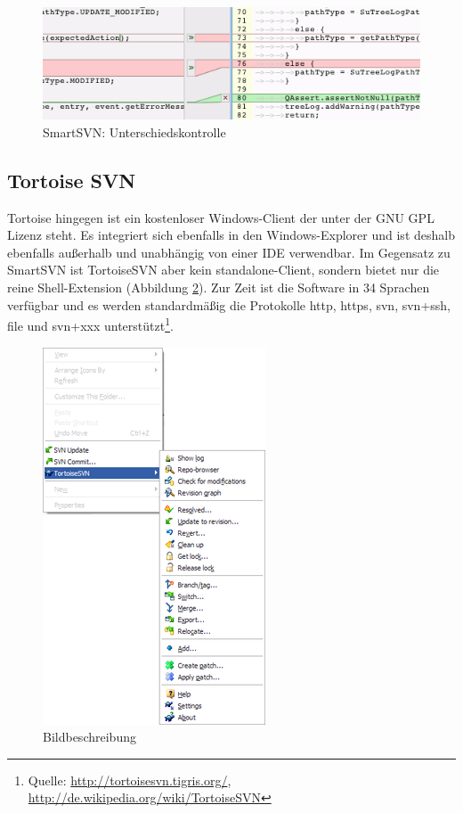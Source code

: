\begin{figure}[!htb]
        \centering
        \includegraphics[width=.9\textwidth]{3_smartsvn3.png}
        \caption{SmartSVN: Unterschiedskontrolle}
        \label{fig:smart3}
\end{figure}
\subsection{Tortoise SVN}
Tortoise hingegen ist ein kostenloser Windows-Client der unter der GNU GPL Lizenz steht. Es integriert sich ebenfalls in den Windows-Explorer und ist deshalb ebenfalls außerhalb und unabhängig von einer IDE verwendbar. Im Gegensatz zu SmartSVN ist TortoiseSVN aber kein standalone-Client, sondern bietet nur die reine Shell-Extension (Abbildung \ref{fig:tortoise1}).
Zur Zeit ist die Software in 34 Sprachen verfügbar und es werden standardmäßig die Protokolle http, https, svn, svn+ssh, file und svn+xxx unterstützt\footnote{Quelle: \url{http://tortoisesvn.tigris.org/}, \url{http://de.wikipedia.org/wiki/TortoiseSVN}}.
\begin{figure}[!htb]
	\centering
	\includegraphics[width=.45\textwidth]{4_turtoise1.png}
	\caption{Bildbeschreibung}
	\label{fig:tortoise1}
\end{figure}  

